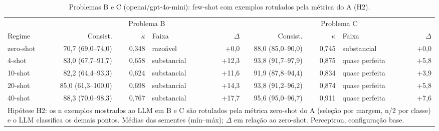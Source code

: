 \begin{table}[htbp]
\centering
\small
\caption{Problemas B e C (openai/gpt-4o-mini): few-shot com exemplos rotulados pela métrica do A (H2).}
\label{tab:bloco1_BC_fewshot_exemplos_da_metrica_gpt4mini}
\begin{tabular}{lrrlrrrlr}
\toprule
 & \multicolumn{4}{c}{Problema B} & \multicolumn{4}{c}{Problema C} \\ \cmidrule(lr){2-5} \cmidrule(lr){6-9}
Regime & Consist. & $\kappa$ & Faixa & $\Delta$ & Consist. & $\kappa$ & Faixa & $\Delta$ \\
\midrule
zero-shot & 70,7 (69,0–74,0) & 0,348 & razoável & +0,0 & 88,0 (85,0–90,0) & 0,745 & substancial & +0,0 \\
4-shot & 83,0 (67,7–91,7) & 0,658 & substancial & +12,3 & 93,8 (91,7–97,9) & 0,875 & quase perfeita & +5,8 \\
10-shot & 82,2 (64,4–93,3) & 0,624 & substancial & +11,6 & 91,9 (87,8–94,4) & 0,834 & quase perfeita & +3,9 \\
20-shot & 85,0 (61,3–100,0) & 0,698 & substancial & +14,3 & 93,8 (91,2–96,2) & 0,874 & quase perfeita & +5,8 \\
40-shot & 88,3 (70,0–98,3) & 0,767 & substancial & +17,7 & 95,6 (95,0–96,7) & 0,911 & quase perfeita & +7,6 \\
\bottomrule
\multicolumn{9}{p{0.95\linewidth}}{\footnotesize Hipótese H2: os n exemplos mostrados ao LLM em B e C são rotulados pela métrica zero-shot do A (seleção por margem, n/2 por classe) e o LLM classifica os demais pontos. Médias das sementes (mín–máx); $\Delta$ em relação ao zero-shot. Perceptron, configuração base.} \\
\end{tabular}
\end{table}
